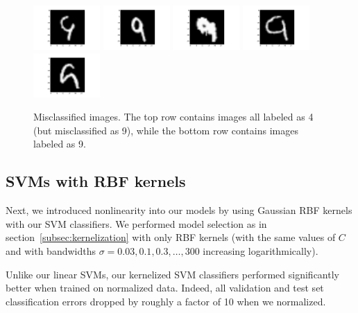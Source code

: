 \documentclass{article}
\begin{document}
\begin{multicols}{2}
\begin{figure}[t]
   \includegraphics[width=1in]{img/4-1-wrong/4-1-wrong-158.pdf} \hspace{-.25in}
   \includegraphics[width=1in]{img/4-1-wrong/4-1-wrong-224.pdf} \hspace{-.25in}
   \includegraphics[width=1in]{img/4-1-wrong/4-1-wrong-247.pdf} \hspace{-.25in}
   \includegraphics[width=1in]{img/4-1-wrong/4-1-wrong-259.pdf} \hspace{-.25in}
   \includegraphics[width=1in]{img/4-1-wrong/4-1-wrong-281.pdf} \hspace{-.25in}
   \caption{Misclassified images. The top row contains images all labeled as 4 (but misclassified as 9), 
   while the bottom row contains images labeled as 9.}
   \label{fig:4-1-wrong}
\end{figure}

\subsection{SVMs with RBF kernels}

Next, we introduced nonlinearity into our models
by using Gaussian RBF kernels with our SVM classifiers.
We performed model selection as in section~\ref{subsec:kernelization}
with only RBF kernels
(with the same values of $C$
and with bandwidths $\sigma = 0.03,0.1,0.3,\dots,300$ increasing logarithmically).

Unlike our linear SVMs,
our kernelized SVM classifiers performed significantly better
when trained on normalized data.
Indeed, all validation and test set classification errors
dropped by roughly a factor of 10
when we normalized.


\end{multicols}
\end{document}

